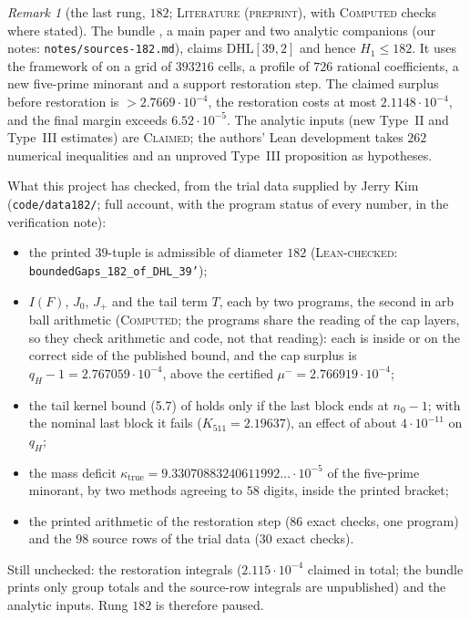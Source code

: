\documentclass[11pt]{amsart}
\theoremstyle{definition}
\theoremstyle{remark}
\newtheorem{remark}[theorem]{Remark}
\newcommand{\lbl}[1]{\textup{\textsc{#1}}}
\begin{document}
\begin{remark}[the last rung, $182$; \lbl{Literature (preprint)}, with \lbl{Computed} checks where stated]\label{rem:sha182}
The bundle \cite{Sha26}, a main paper and two analytic companions (our
notes: \texttt{notes/}\allowbreak\texttt{sources-182.md}), claims $\mathrm{DHL}[39,2]$
and hence $H_1\le182$. It uses the framework of \cite{OAI26} on a grid of
$393216$ cells, a profile of $726$ rational coefficients, a new five-prime
minorant and a support restoration step. The claimed surplus before
restoration is $>2.7669\cdot10^{-4}$, the restoration costs at most
$2.1148\cdot10^{-4}$, and the final margin exceeds $6.52\cdot10^{-5}$. The
analytic inputs (new Type~II and Type~III estimates) are \lbl{Claimed}; the
authors' Lean development takes $262$ numerical inequalities and an unproved
Type~III proposition as hypotheses.

What this project has checked, from the trial data supplied by Jerry Kim
(\texttt{code/}\allowbreak\texttt{data182/}; full account, with the program
status of every number, in the verification note):
\begin{itemize}
\item the printed $39$-tuple is admissible of diameter $182$
  (\lbl{Lean-checked}:\\ \texttt{boundedGaps\_182\_of\_DHL\_39'});
\item $I(F)$, $J_0$, $J_+$ and the tail term $T$, each by two programs, the
  second in arb ball arithmetic (\lbl{Computed}; the programs share the reading
  of the cap layers, so they check arithmetic and code, not that reading):
  each is inside or on the correct side of the published bound, and the cap
  surplus is $q_H-1=2.767059\cdot10^{-4}$, above the certified
  $\mu^-=2.766919\cdot10^{-4}$;
\item the tail kernel bound (5.7) of \cite{Sha26} holds only if the last block
  ends at $n_0-1$; with the nominal last block it fails ($K_{511}=2.19637$), an
  effect of about $4\cdot10^{-11}$ on $q_H$;
\item the mass deficit $\kappa_{\mathrm{true}}=9.33070883240611992\ldots\cdot10^{-5}$
  of the five-prime minorant, by two methods agreeing to $58$ digits, inside the
  printed bracket;
\item the printed arithmetic of the restoration step ($86$ exact checks, one
  program) and the $98$ source rows of the trial data ($30$ exact checks).
\end{itemize}
Still unchecked: the restoration integrals ($2.115\cdot10^{-4}$ claimed in
total; the bundle prints only group totals and the source-row integrals are
unpublished) and the analytic inputs. Rung $182$ is therefore paused.
\end{remark}
\end{document}
